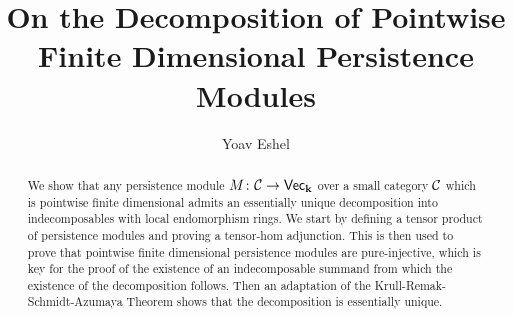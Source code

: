 \documentclass[12pt,vu]{adammath}
\title{On the Decomposition of Pointwise Finite Dimensional Persistence Modules}
\author[y.eshel@student.vu.nl, 2660535]{Yoav Eshel}
\begin{document}
\maketitle

\frontmatter
\begin{abstract}
    We show that any persistence module $M\colon\mathcal{C}\to\normalfont\mathsf{Vec}_{\mathbf{k}}$ over a small category $\mathcal{C}$ which is pointwise finite dimensional admits an essentially unique decomposition into indecomposables with local endomorphism rings.
    We start by defining a tensor product of persistence modules and proving a tensor-hom adjunction.
    This is then used to prove that pointwise finite dimensional persistence modules are pure-injective, which is key for the proof of the existence of an indecomposable summand from which the existence of the decomposition follows.
    Then an adaptation of the Krull-Remak-Schmidt-Azumaya Theorem shows that the decomposition is essentially unique.
\end{abstract}

\tableofcontents

\mainmatter






\printbibliography[title=References]

\appendix
\end{document}
